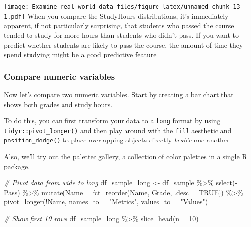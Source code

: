 \documentclass[
]{article}
\newenvironment{Shaded}{\begin{snugshade}}{\end{snugshade}}
\newcommand{\AttributeTok}[1]{\textcolor[rgb]{0.77,0.63,0.00}{#1}}
\newcommand{\CommentTok}[1]{\textcolor[rgb]{0.56,0.35,0.01}{\textit{#1}}}
\newcommand{\ConstantTok}[1]{\textcolor[rgb]{0.00,0.00,0.00}{#1}}
\newcommand{\DecValTok}[1]{\textcolor[rgb]{0.00,0.00,0.81}{#1}}
\newcommand{\FunctionTok}[1]{\textcolor[rgb]{0.00,0.00,0.00}{#1}}
\newcommand{\NormalTok}[1]{#1}
\newcommand{\OtherTok}[1]{\textcolor[rgb]{0.56,0.35,0.01}{#1}}
\newcommand{\SpecialCharTok}[1]{\textcolor[rgb]{0.00,0.00,0.00}{#1}}
\newcommand{\StringTok}[1]{\textcolor[rgb]{0.31,0.60,0.02}{#1}}
\begin{document}
\texttt{[image: Examine-real-world-data\_files/figure-latex/unnamed-chunk-13-1.pdf]}
When you compare the StudyHours distributions, it's immediately
apparent, if not particularly surprising, that students who passed the
course tended to study for more hours than students who didn't pass. If
you want to predict whether students are likely to pass the course, the
amount of time they spend studying might be a good predictive feature.

\hypertarget{compare-numeric-variables}{%
\subsubsection{Compare numeric
variables}\label{compare-numeric-variables}}

Now let's compare two numeric variables. Start by creating a bar chart
that shows both grades and study hours.

To do this, you can first transform your data to a \texttt{long} format
by using \texttt{tidyr::pivot\_longer()} and then play around with the
\texttt{fill} aesthetic and \texttt{position\_dodge()} to place
overlapping objects directly \emph{beside} one another.

Also, we'll try out
\href{https://pmassicotte.github.io/paletteer_gallery/}{the paletter
gallery}, a collection of color palettes in a single R package.

\begin{Shaded}
\begin{Highlighting}[]
\CommentTok{\# Pivot data from wide to long}
\NormalTok{df\_sample\_long }\OtherTok{\textless{}{-}}\NormalTok{ df\_sample }\SpecialCharTok{\%\textgreater{}\%}
  \FunctionTok{select}\NormalTok{(}\SpecialCharTok{{-}}\NormalTok{Pass) }\SpecialCharTok{\%\textgreater{}\%}
  \FunctionTok{mutate}\NormalTok{(}\AttributeTok{Name =} \FunctionTok{fct\_reorder}\NormalTok{(Name, Grade, }\AttributeTok{.desc =} \ConstantTok{TRUE}\NormalTok{)) }\SpecialCharTok{\%\textgreater{}\%} 
  \FunctionTok{pivot\_longer}\NormalTok{(}\SpecialCharTok{!}\NormalTok{Name, }\AttributeTok{names\_to =} \StringTok{"Metrics"}\NormalTok{, }\AttributeTok{values\_to =} \StringTok{"Values"}\NormalTok{)}

\CommentTok{\# Show first 10 rows}
\NormalTok{df\_sample\_long }\SpecialCharTok{\%\textgreater{}\%} 
  \FunctionTok{slice\_head}\NormalTok{(}\AttributeTok{n =} \DecValTok{10}\NormalTok{)}
\end{Highlighting}
\end{Shaded}
\end{document}
